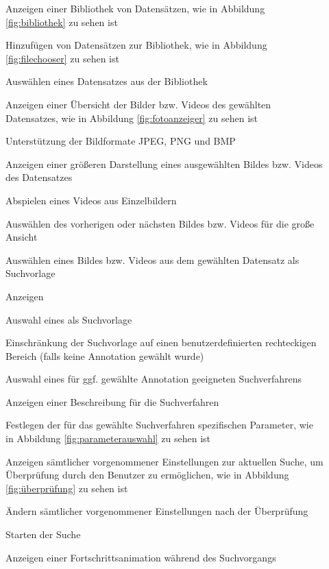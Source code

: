 \begin{description}
	\item[] Anzeigen einer Bibliothek von Datensätzen, wie in Abbildung \ref{fig:bibliothek} zu sehen ist
	\item[] Hinzufügen von Datensätzen zur Bibliothek, wie in Abbildung \ref{fig:filechooser} zu sehen ist
	\item[] Ausw\"ahlen eines Datensatzes aus der Bibliothek
	\item[] Anzeigen einer Übersicht der Bilder bzw. Videos des gewählten Datensatzes, wie in Abbildung \ref{fig:fotoanzeiger} zu sehen ist
	\item[] Unterstützung der Bildformate JPEG, PNG und BMP
	\item[] Anzeigen einer größeren Darstellung eines ausgewählten Bildes bzw. Videos des Datensatzes
	\item[] Abspielen eines Videos aus Einzelbildern
	\item[] Auswählen des vorherigen oder nächsten Bildes bzw. Videos für die große Ansicht %
	\item[] Ausw\"ahlen eines Bildes bzw. Videos aus dem gewählten Datensatz als Suchvorlage
	\item[] Anzeigen 
	\item[] Auswahl eines  als Suchvorlage
	\item[] Einschränkung der Suchvorlage auf einen benutzerdefinierten rechteckigen Bereich (falls keine \gls{Annotation} gewählt wurde)
	\item[] Auswahl eines für ggf. gewählte \gls{Annotation} geeigneten Suchverfahrens
	\item[] Anzeigen einer Beschreibung für die Suchverfahren
	\item[] Festlegen der für das gewählte Suchverfahren spezifischen Parameter, wie in Abbildung \ref{fig:parameterauswahl} zu sehen ist
	\item[] Anzeigen sämtlicher vorgenommener Einstellungen zur aktuellen Suche, um Überprüfung durch den Benutzer zu ermöglichen, wie in Abbildung \ref{fig:überprüfung} zu sehen ist
	\item[] Ändern sämtlicher vorgenommener Einstellungen nach der Überprüfung
	\newline
	\item[] Starten der Suche
	\item[] Anzeigen einer Fortschrittsanimation während des Suchvorgangs


\end{description}
